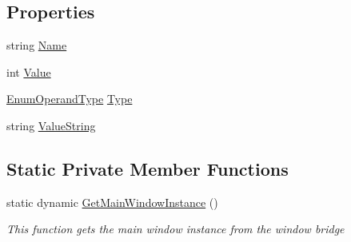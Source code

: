 \subsection*{Properties}
\begin{DoxyCompactItemize}
\item 
string \hyperlink{class_c_p_u___o_s___simulator_1_1_c_p_u_1_1_special_register_ad8ad1efaf680db5471184a74f911b558}{Name}
\item 
int \hyperlink{class_c_p_u___o_s___simulator_1_1_c_p_u_1_1_special_register_aeff33618d376eeaef1e62d6833074bd4}{Value}
\item 
\hyperlink{namespace_c_p_u___o_s___simulator_1_1_c_p_u_ad49cfe442b74115a326c03b7ae848f76}{Enum\+Operand\+Type} \hyperlink{class_c_p_u___o_s___simulator_1_1_c_p_u_1_1_special_register_afd9e45080d792861e577dde31cdb6d3e}{Type}
\item 
string \hyperlink{class_c_p_u___o_s___simulator_1_1_c_p_u_1_1_special_register_a60a2bcd516cedf8bb485c2e36bbc3235}{Value\+String}
\end{DoxyCompactItemize}
\subsection*{Static Private Member Functions}
\begin{DoxyCompactItemize}
\item 
static dynamic \hyperlink{class_c_p_u___o_s___simulator_1_1_c_p_u_1_1_special_register_a0ed54c8fcd7674bcb87fef3eda712af2}{Get\+Main\+Window\+Instance} ()
\begin{DoxyCompactList}\small\item\em This function gets the main window instance from the window bridge \end{DoxyCompactList}\end{DoxyCompactItemize}
